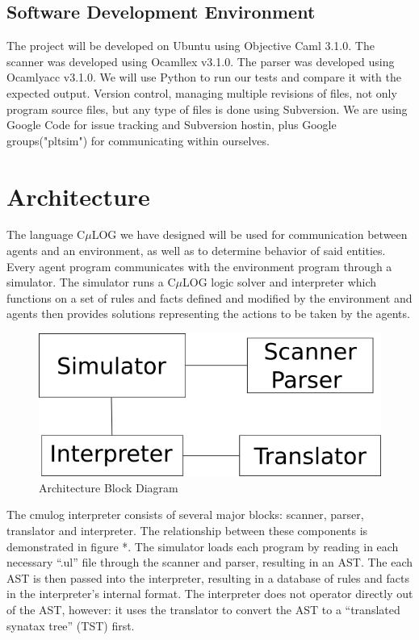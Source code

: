 \documentclass[onecolumn,titlepage]{article}
\begin{document}
\subsection{Software Development Environment}
The project will be developed on Ubuntu using Objective Caml
3.1.0. The scanner was developed using Ocamllex v3.1.0. The parser was
developed using Ocamlyacc v3.1.0. We will use Python to run our tests
and compare it with the expected output. Version control, managing
multiple revisions of files, not only program source files, but any
type of files is done using Subversion. We are using Google Code for
issue tracking and Subversion hostin, plus Google groups("pltsim") for
communicating within ourselves.

\section{Architecture}

The language C$\mu$LOG we have designed will be used for communication
between agents and an environment, as well as to determine behavior of
said entities. Every agent program communicates with the environment
program through a simulator. The simulator runs a C$\mu$LOG logic
solver and interpreter which functions on a set of rules and facts
defined and modified by the environment and agents then provides
solutions representing the actions to be taken by the agents.

\begin{figure}[htp]
\label{block}
\caption{ Architecture Block Diagram }
\begin{center}
\includegraphics[scale=.6]{block.png}
\end{center}
\end{figure}

The cmulog interpreter consists of several major blocks: scanner,
parser, translator and interpreter. The relationship between these
components is demonstrated in figure *.  The simulator loads each
program by reading in each necessary ``.ul'' file through the scanner
and parser, resulting in an AST.  The each AST is then passed into the
interpreter, resulting in a database of rules and facts in the
interpreter's internal format.  The interpreter does not operator
directly out of the AST, however: it uses the translator to convert
the AST to a ``translated synatax tree'' (TST) first.  
\end{document}
